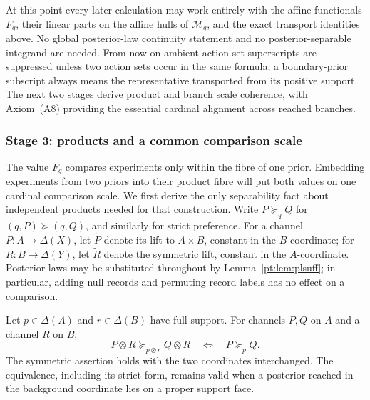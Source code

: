 At this point every later calculation may work entirely with the affine
functionals $F_q$, their linear parts on the affine hulls of
$\mathcal M_q$, and the exact transport identities above.  No global
posterior-law continuity statement and no posterior-separable integrand are
needed.  From now on ambient action-set superscripts are suppressed unless
two action sets occur in the same formula; a boundary-prior subscript always
means the representative transported from its positive support.  The next two
stages derive product and branch scale coherence, with
Axiom~\textup{(A8)} providing the essential cardinal alignment across reached
branches.

\subsubsection{Stage 3: products and a common comparison scale}

The value $F_q$ compares experiments only within the fibre of one prior.
Embedding experiments from two priors into their product fibre will put both
values on one cardinal comparison scale.  We first derive the only
separability fact about independent products needed for that construction.
Write $P\succeq_qQ$ for $(q,P)\succeq(q,Q)$, and similarly for strict
preference.  For a channel $P:A\to\Delta(X)$, let $\widetilde P$ denote its
lift to $A\times B$, constant in the $B$-coordinate; for
$R:B\to\Delta(Y)$, let $\widetilde R$ denote the symmetric lift, constant in
the $A$-coordinate.
Posterior laws may be substituted throughout by Lemma~\ref{pt:lem:plsuff};
in particular, adding null records and permuting record labels has no effect
on a comparison.

\begin{lemma}
\label{pt:lem:background}
Let $p\in\Delta(A)$ and $r\in\Delta(B)$ have full support.  For channels
$P,Q$ on $A$ and a channel $R$ on $B$,
\begin{equation}
 P\otimes R\succeq_{p\otimes r}Q\otimes R
 \quad\Longleftrightarrow\quad
 P\succeq_p Q .
\tag{BI}\label{pt:eq:backgroundinert}
\end{equation}
The symmetric assertion holds with the two coordinates interchanged.  The
equivalence, including its strict form, remains valid when a posterior reached
in the background coordinate lies on a proper support face.
\end{lemma}

